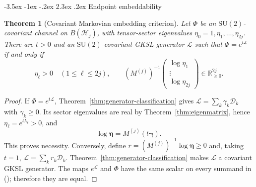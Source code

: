 \documentclass[twoside,10pt]{article}
\makeatletter
\numberwithin{equation}{section}
\theoremstyle{slbody}
\newtheorem{theorem}{Theorem}[section]
\theoremstyle{definition}
\theoremstyle{remark}
\newcommand{\SU}{\mathrm{SU}(2)}
\newcommand{\cL}{\mathcal L}
\newcommand{\cD}{\mathcal D}
\newcommand{\Rplus}{\mathbb R_{\geq 0}}
\renewcommand{\section}{%
  \@startsection{section}{1}{\z@}%
    {-3.5ex \@plus -1ex \@minus -.2ex}%
    {2.3ex \@plus .2ex}%
    {\normalfont\large\bfseries}}
\renewcommand{\eqref}[1]{%
  \textup{{\normalfont(\oldstylenums{\ref{#1}}}\normalfont)}}
\makeatother
\begin{document}
\section{Endpoint embeddability}

\begin{theorem}[Covariant Markovian embedding criterion]
\label{thm:endpoint-criterion}
Let \(\Phi\) be an \(\SU\)-covariant channel on \(B(\mathcal H_j)\),
with tensor-sector eigenvalues \(\eta_0=1,\eta_1,\ldots,\eta_{2j}\).
There are \(t>0\) and an \(\SU\)-covariant GKSL generator \(\cL\) such
that \(\Phi=e^{t\cL}\) if and only if
\begin{equation}\label{eq:endpoint-criterion}
 \eta_\ell>0\quad(1\leq\ell\leq2j),
 \qquad
 (M^{(j)})^{-1}
 \begin{pmatrix}\log\eta_1\\ \vdots\\ \log\eta_{2j}\end{pmatrix}
 \in\Rplus^{2j}.
\end{equation}
\end{theorem}

\begin{proof}
If \(\Phi=e^{t\cL}\), Theorem~\ref{thm:generator-classification}
gives \(\cL=\sum_k\gamma_k\cD_k\) with \(\gamma_k\geq0\).  Its sector
eigenvalues are real by Theorem~\ref{thm:eigenmatrix}, hence
\(\eta_\ell=e^{t\lambda_\ell}>0\), and
\begin{equation*}
 \log\bm\eta=M^{(j)}(t\bm\gamma).
\end{equation*}
This proves necessity.  Conversely, define
\(r=(M^{(j)})^{-1}\log\bm\eta\geq0\) and, taking \(t=1\),
\(\cL=\sum_kr_k\cD_k\).  Theorem~\ref{thm:generator-classification}
makes \(\cL\) a covariant GKSL generator.  The maps \(e^{\cL}\) and
\(\Phi\) have the same scalar on every summand in
\eqref{eq:adjoint-decomposition}; therefore they are equal.
\end{proof}
\end{document}
